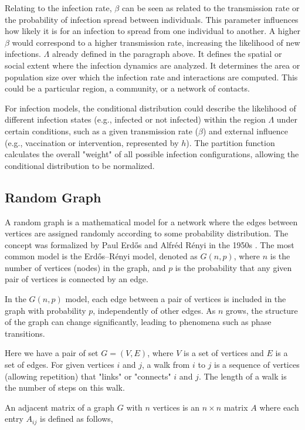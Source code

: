 \documentclass[11pt]{book}
\begin{document}
Relating to the infection rate,  $\beta$ can be seen as related to the transmission rate or the probability of infection spread between individuals. This parameter influences how likely it is for an infection to spread from one individual to another. A higher $\beta$ would correspond to a higher transmission rate, increasing the likelihood of new infections. $\Lambda$ already defined in the paragraph above. It defines the spatial or social extent where the infection dynamics are analyzed. It determines the area or population size over which the infection rate and interactions are computed. This could be a particular region, a community, or a network of contacts. 

For infection models, the conditional distribution could describe the likelihood of different infection states (e.g., infected or not infected) within the region $\Lambda$ under certain conditions, such as a given transmission rate ($\beta$) and external influence (e.g., vaccination or intervention, represented by $h$). The partition function calculates the overall "weight" of all possible infection configurations, allowing the conditional distribution to be normalized. 

\subsection{Random Graph}
A random graph is a mathematical model for a network where the edges between vertices are assigned randomly according to some probability distribution. The concept was formalized by Paul Erdős and Alfréd Rényi in the 1950s \cite{ER}. The most common model is the Erdős–Rényi model, denoted as $G(n, p)$, where $n$ is the number of vertices (nodes) in the graph, and $p$ is the probability that any given pair of vertices is connected by an edge.

In the $G(n, p)$ model, each edge between a pair of vertices is included in the graph with probability $p$, independently of other edges. As $n$ grows, the structure of the graph can change significantly, leading to phenomena such as phase transitions.

Here we have a pair of set $G=(V,E)$, where $V$ is a set of vertices and $E$ is a set of edges. For given vertices $i$ and $j$, a walk from $i$ to $j$ is a sequence of vertices (allowing repetition) that "links" or "connects" $i$ and $j$. The length of a walk is the number of steps on this walk. 

An adjacent matrix of a graph $G$ with $n$ vertices is an $n\times n$ matrix $A$ where each entry $A_{ij}$ is defined as follows,
\end{document}
